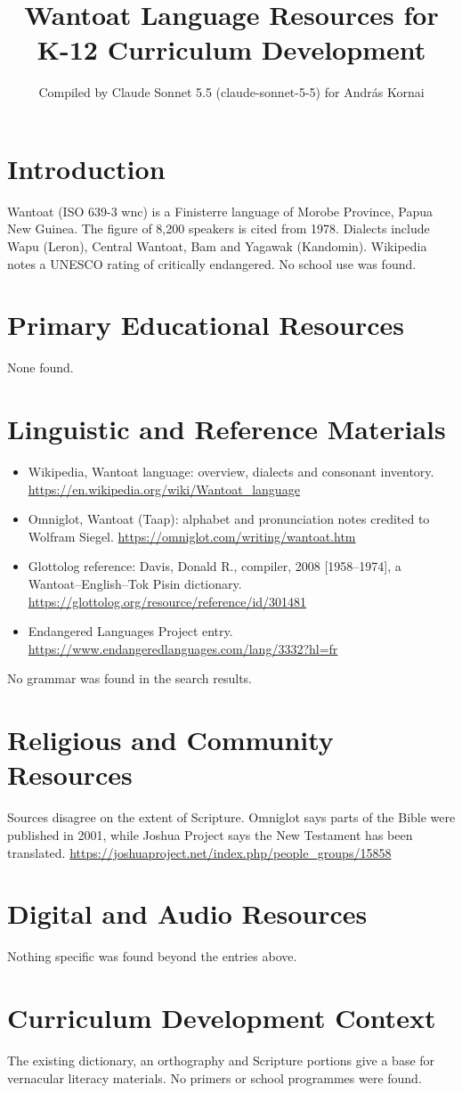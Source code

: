 \documentclass[12pt]{article}
\title{Wantoat Language Resources for K-12 Curriculum Development}
\author{Compiled by Claude Sonnet 5.5 (claude-sonnet-5-5) for Andr\'as Kornai}
\date{}
\begin{document}
\maketitle

\section{Introduction}
Wantoat (ISO 639-3 wnc) is a Finisterre language of Morobe Province, Papua New Guinea. The figure of 8,200 speakers is cited from 1978. Dialects include Wapu (Leron), Central Wantoat, Bam and Yagawak (Kandomin). Wikipedia notes a UNESCO rating of critically endangered. No school use was found.

\section{Primary Educational Resources}
None found.

\section{Linguistic and Reference Materials}
\begin{itemize}
\item Wikipedia, Wantoat language: overview, dialects and consonant inventory. \url{https://en.wikipedia.org/wiki/Wantoat_language}
\item Omniglot, Wantoat (Taap): alphabet and pronunciation notes credited to Wolfram Siegel. \url{https://omniglot.com/writing/wantoat.htm}
\item Glottolog reference: Davis, Donald R., compiler, 2008 [1958--1974], a Wantoat--English--Tok Pisin dictionary. \url{https://glottolog.org/resource/reference/id/301481}
\item Endangered Languages Project entry. \url{https://www.endangeredlanguages.com/lang/3332?hl=fr}
\end{itemize}
No grammar was found in the search results.

\section{Religious and Community Resources}
Sources disagree on the extent of Scripture. Omniglot says parts of the Bible were published in 2001, while Joshua Project says the New Testament has been translated. \url{https://joshuaproject.net/index.php/people_groups/15858}

\section{Digital and Audio Resources}
Nothing specific was found beyond the entries above.

\section{Curriculum Development Context}
The existing dictionary, an orthography and Scripture portions give a base for vernacular literacy materials. No primers or school programmes were found.
\end{document}
